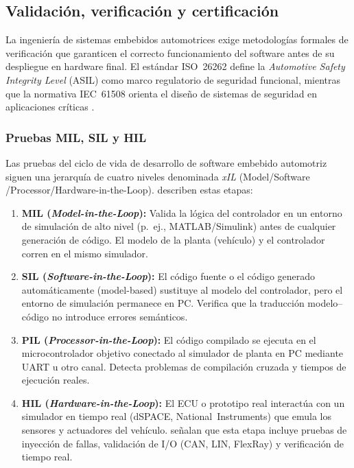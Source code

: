\subsection{Validación, verificación y certificación}

La ingeniería de sistemas embebidos automotrices exige
metodologías formales de verificación que garanticen el
correcto funcionamiento del software antes de su despliegue en
hardware final.  El estándar ISO~26262 \citep{ISO26262_2018}
define la \textit{Automotive Safety Integrity Level} (ASIL)
como marco regulatorio de seguridad funcional, mientras que la
normativa IEC~61508 orienta el diseño de sistemas de seguridad
en aplicaciones críticas \citep{IEC61508}.

\subsubsection{Pruebas MIL, SIL y HIL}

Las pruebas del ciclo de vida de desarrollo de software
embebido automotriz siguen una jerarquía de cuatro niveles
denominada \textit{xIL} (Model\allowbreak/Software\allowbreak
/Processor\allowbreak/Hardware\allowbreak-in-the-Loop).
\citet{VVDNTech2024} describen estas etapas:

\begin{enumerate}
	\item \textbf{MIL (\textit{Model-in-the-Loop}):} Valida la
	lógica del controlador en un entorno de simulación de
	alto nivel (p.~ej., MATLAB/Simulink) antes de
	cualquier generación de código.  El modelo de la
	planta (vehículo) y el controlador corren en el mismo
	simulador.
	
	\item \textbf{SIL (\textit{Software-in-the-Loop}):} El
	código fuente o el código generado automáticamente
	(model-based) sustituye al modelo del controlador,
	pero el entorno de simulación permanece en PC.
	Verifica que la traducción modelo--código no introduce
	errores semánticos.
	
	\item \textbf{PIL (\textit{Processor-in-the-Loop}):} El
	código compilado se ejecuta en el microcontrolador
	objetivo conectado al simulador de planta en PC
	mediante UART u otro canal.  Detecta problemas de
	compilación cruzada y tiempos de ejecución reales.
	
	\item \textbf{HIL (\textit{Hardware-in-the-Loop}):} El ECU
	o prototipo real interactúa con un simulador en tiempo
	real (dSPACE, National~Instruments) que emula los
	sensores y actuadores del vehículo.
	\citet{VVDNTech2024} señalan que esta etapa incluye
	pruebas de inyección de fallas, validación de I/O
	(CAN, LIN, FlexRay) y verificación de tiempo real.
\end{enumerate}

